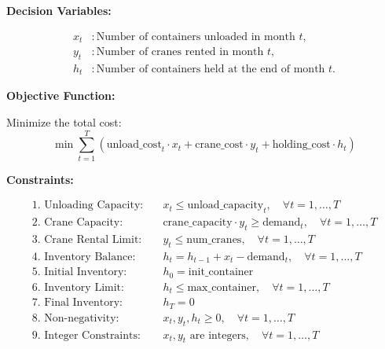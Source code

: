 \documentclass{article}
\begin{document}
\textbf{Decision Variables:}

\begin{align*}
x_t & : \text{Number of containers unloaded in month } t, \\
y_t & : \text{Number of cranes rented in month } t, \\
h_t & : \text{Number of containers held at the end of month } t.
\end{align*}

\textbf{Objective Function:}

Minimize the total cost:
\[
\min \sum_{t=1}^{T} \left( \text{unload\_cost}_{t} \cdot x_t + \text{crane\_cost} \cdot y_t + \text{holding\_cost} \cdot h_t \right)
\]

\textbf{Constraints:}

\begin{align*}
\text{1. Unloading Capacity:} & \quad x_t \leq \text{unload\_capacity}_{t}, \quad \forall t = 1, \ldots, T \\
\text{2. Crane Capacity:} & \quad \text{crane\_capacity} \cdot y_t \geq \text{demand}_{t}, \quad \forall t = 1, \ldots, T \\
\text{3. Crane Rental Limit:} & \quad y_t \leq \text{num\_cranes}, \quad \forall t = 1, \ldots, T \\
\text{4. Inventory Balance:} & \quad h_t = h_{t-1} + x_t - \text{demand}_{t}, \quad \forall t = 1, \ldots, T \\
\text{5. Initial Inventory:} & \quad h_0 = \text{init\_container} \\
\text{6. Inventory Limit:} & \quad h_t \leq \text{max\_container}, \quad \forall t = 1, \ldots, T \\
\text{7. Final Inventory:} & \quad h_T = 0 \\
\text{8. Non-negativity:} & \quad x_t, y_t, h_t \geq 0, \quad \forall t = 1, \ldots, T \\
\text{9. Integer Constraints:} & \quad x_t, y_t \text{ are integers}, \quad \forall t = 1, \ldots, T
\end{align*}
\end{document}
